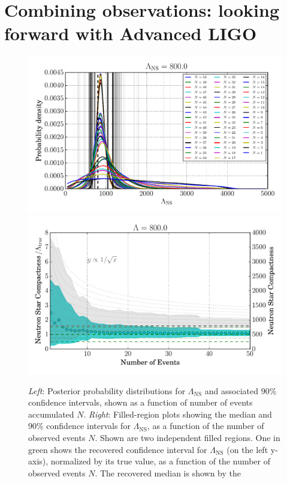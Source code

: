 \documentclass[aps,prd,amsmath,floats,floatfix, twocolumn,
superscriptaddress,nofootinbib,showpacs]{revtex4-1}
\newcommand{\lambdans}{\Lambda_\mathrm{NS}}
\begin{document}
\section{Combining observations: looking forward with Advanced LIGO}\label{s1:multiple_observations}
% 
% 
\begin{figure}
\centering    
\includegraphics[width=1.\columnwidth]{plots/pdfLambda_vs_N_L800.pdf}
\includegraphics[width=1.\columnwidth]{plots/FillBetweenNormErrorBarsLambda_vs_N_L800.pdf}
\caption{{\it Left}:  Posterior probability distributions for $\lambdans$
and associated $90\%$ confidence intervals, shown as a function of number of events 
accumulated $N$.
{\it Right}: Filled-region plots showing the median and $90\%$ confidence intervals
for $\lambdans$, as a function of the number of observed events $N$.
 Shown are two independent filled regions. 
%  
 One in green shows the recovered confidence interval
 for $\lambdans$ (on the left y-axis), normalized by its true value,
 as a function of the 
 number of observed events $N$. The recovered median is shown by the
}
\end{figure}
\end{document}

